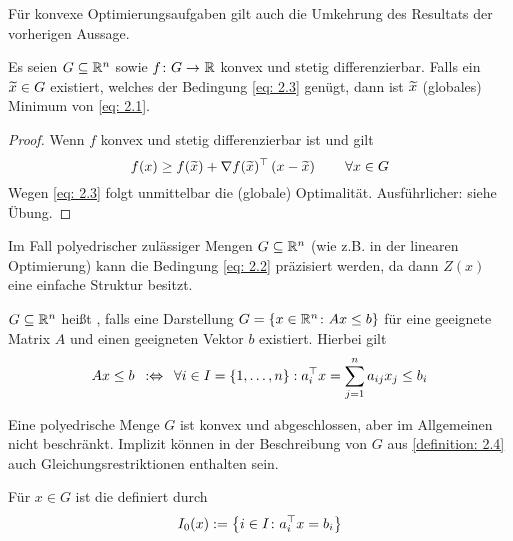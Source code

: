Für konvexe Optimierungsaufgaben gilt auch die Umkehrung des Resultats der vorherigen Aussage.

\begin{aussage} %
	Es seien $G \subseteq \mathbb{R}^n$ sowie $\abb{f}{G}{\R}$ konvex und stetig differenzierbar. Falls ein $\widetilde{x} \in G$ existiert, welches der Bedingung \eqref{eq: 2.3} genügt, dann ist $\widetilde{x}$ (globales) Minimum von \eqref{eq: 2.1}.
\end{aussage}
\begin{proof}
	Wenn $f$ konvex und stetig differenzierbar ist und gilt
	\begin{equation*}
	f(x) \ge f(\widetilde{x}) + \nabla f(\widetilde{x})^{\top} \left( x - \widetilde{x} \right) \qquad \forall x \in G
	\end{equation*}
	Wegen \eqref{eq: 2.3} folgt unmittelbar die (globale) Optimalität. Ausführlicher: siehe Übung.
\end{proof}

Im Fall polyedrischer zulässiger Mengen $G \subseteq \mathbb{R}^n$ (wie z.B. in der linearen Optimierung) kann die Bedingung \eqref{eq: 2.2} präzisiert werden, da dann $Z(x)$ eine einfache Struktur besitzt.

\begin{definition} %
	\label{definition: 2.4}
	$G \subseteq \mathbb{R}^n$ heißt , falls eine Darstellung $G = \left\{ x \in \mathbb{R}^n \colon Ax \le b \right\}$ für eine geeignete Matrix $A$ und einen geeigneten Vektor $b$ existiert. Hierbei gilt
	\begin{equation*}
	Ax \le b \enskip \mathrel{:\Leftrightarrow} \enskip \forall i \in I = \left\{ 1,\dots,n \right\}: a_i^{\top}x = \sum_{j=1}^n a_{ij}x_j \le b_i
	\end{equation*}
\end{definition}


\begin{bemerkung} %
	Eine polyedrische Menge $G$ ist konvex und abgeschlossen, aber im Allgemeinen nicht beschränkt. Implizit können in der Beschreibung von $G$ aus \cref{definition: 2.4} auch Gleichungsrestriktionen enthalten sein.
\end{bemerkung}

\begin{definition} %
	Für $x \in G$ ist die  definiert durch 
	\begin{equation*}
	I_0(x) \mathrel{:=} \left\{ i \in I \colon a_i^{\top} x = b_i \right\}
	\end{equation*}
\end{definition}

